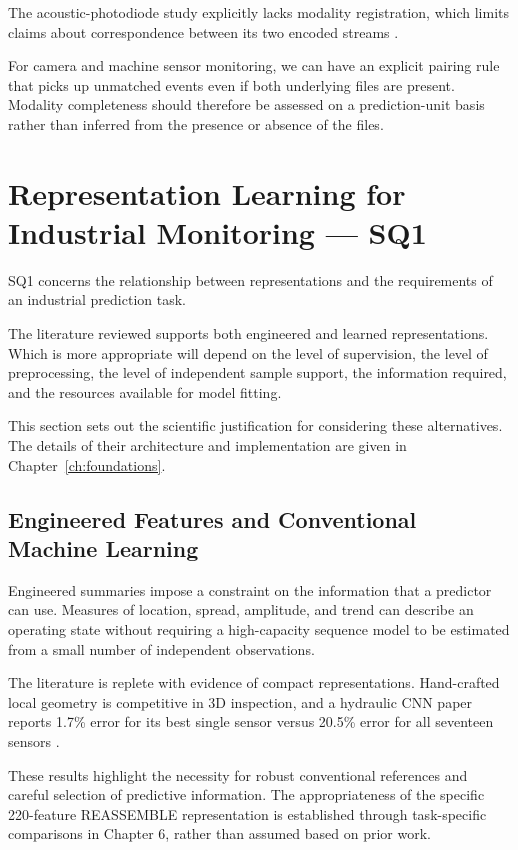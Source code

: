 The acoustic-photodiode study explicitly lacks modality registration, which limits claims about
correspondence between its two encoded streams \parencite{Li2022A}.

For camera and machine sensor monitoring, we can have an explicit pairing rule that picks up
unmatched events even if both underlying files are present. Modality completeness should therefore
be assessed on a prediction-unit basis rather than inferred from the presence or absence of the
files.

\section{Representation Learning for Industrial Monitoring --- SQ1}

SQ1 concerns the relationship between representations and the requirements of an industrial
prediction task.

The literature reviewed supports both engineered and learned representations. Which is more
appropriate will depend on the level of supervision, the level of preprocessing, the level of
independent sample support, the information required, and the resources available for model fitting.

This section sets out the scientific justification for considering these alternatives. The details
of their architecture and implementation are given in Chapter~\ref{ch:foundations}.

\subsection{Engineered Features and Conventional Machine Learning}

Engineered summaries impose a constraint on the information that a predictor can use. Measures of
location, spread, amplitude, and trend can describe an operating state without requiring a
high-capacity sequence model to be estimated from a small number of independent observations.

The literature is replete with evidence of compact representations. Hand-crafted local geometry is
competitive in 3D inspection, and a hydraulic CNN paper reports 1.7\% error for its best single
sensor versus 20.5\% error for all seventeen sensors \parencite{Horwitz2023Back,Goodarzi2023Deep}.

These results highlight the necessity for robust conventional references and careful selection of
predictive information. The appropriateness of the specific 220-feature REASSEMBLE representation is
established through task-specific comparisons in Chapter 6, rather than assumed based on prior work.

